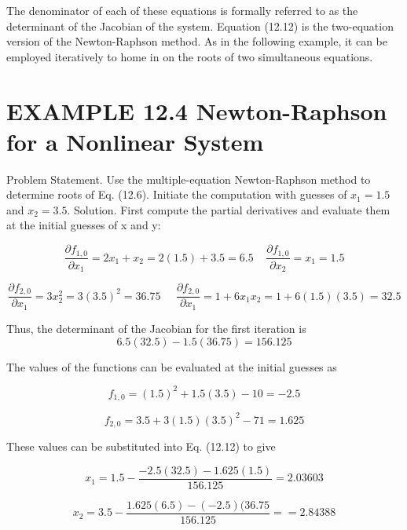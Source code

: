 \documentclass[../main.tex]{subfiles}
\begin{document}
The denominator of each of these equations is formally referred to as the determinant of the
Jacobian of the system.
Equation (12.12) is the two-equation version of the Newton-Raphson method. As in
the following example, it can be employed iteratively to home in on the roots of two simultaneous equations.

\section*{EXAMPLE 12.4 Newton-Raphson for a Nonlinear System}

Problem Statement. Use the multiple-equation Newton-Raphson method to determine
roots of Eq. (12.6). Initiate the computation with guesses of $x_{1}=1.5$ and $x_{2}=3.5$.
Solution. First compute the partial derivatives and evaluate them at the initial guesses of
x and y:

\begin{equation}
\frac{\partial f_{1,0}}{\partial x_{1}}=2x_{1}+x_{2}=2(1.5)+3.5=6.5
\; \; \; \;
\frac{\partial f_{1,0}}{\partial x_{2}}=x_{1}=1.5
\end{equation}

\begin{equation}
\frac{\partial f_{2,0}}{\partial x_{1}}=3x_{2}^{2}=3(3.5)^{2}=36.75
\; \; \; \; \;
\frac{\partial f_{2,0}}{\partial x_{1}}=1+6x_{1}x_{2}=1+6(1.5)(3.5)=32.5
\end{equation}

Thus, the determinant of the Jacobian for the first iteration is
\begin{equation}
6.5(32.5)-1.5(36.75) = 156.125
\end{equation}

The values of the functions can be evaluated at the initial guesses as

\begin{equation}
f_{1,0}=(1.5)^{2}+1.5(3.5)-10=-2.5
\end{equation}

\begin{equation}
f_{2,0}=3.5+3(1.5)(3.5)^{2}-71=1.625
\end{equation}

These values can be substituted into Eq. (12.12) to give

\begin{equation}
x_{1}=1.5-\frac{-2.5(32.5)-1.625(1.5)}{156.125}=2.03603
\end{equation}

\begin{equation}
x_{2}=3.5-\frac{1.625(6.5)-(-2.5)(36.75}{156.125}== 2.84388
\end{equation}
\end{document}
